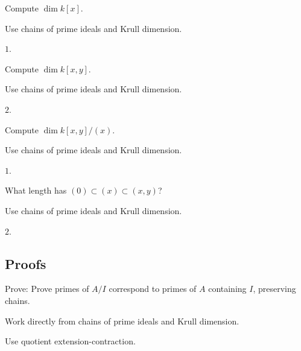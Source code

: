 \begin{exercise}\label{exr:vi29-expand-02}
Compute $\dim k[x]$.
\end{exercise}
\begin{hint}
Use chains of prime ideals and Krull dimension.
\end{hint}
\begin{solution}
$1$.
\end{solution}

\begin{exercise}\label{exr:vi29-expand-03}
Compute $\dim k[x,y]$.
\end{exercise}
\begin{hint}
Use chains of prime ideals and Krull dimension.
\end{hint}
\begin{solution}
$2$.
\end{solution}

\begin{exercise}\label{exr:vi29-expand-04}
Compute $\dim k[x,y]/(x)$.
\end{exercise}
\begin{hint}
Use chains of prime ideals and Krull dimension.
\end{hint}
\begin{solution}
$1$.
\end{solution}

\begin{exercise}\label{exr:vi29-expand-05}
What length has $(0)\subset(x)\subset(x,y)$?
\end{exercise}
\begin{hint}
Use chains of prime ideals and Krull dimension.
\end{hint}
\begin{solution}
$2$.
\end{solution}

\subsection*{Proofs}

\begin{exercise}\label{exr:vi29-expand-06}
Prove: Prove primes of $A/I$ correspond to primes of $A$ containing $I$, preserving chains.
\end{exercise}
\begin{hint}
Work directly from chains of prime ideals and Krull dimension.
\end{hint}
\begin{solution}
Use quotient extension-contraction.
\end{solution}

